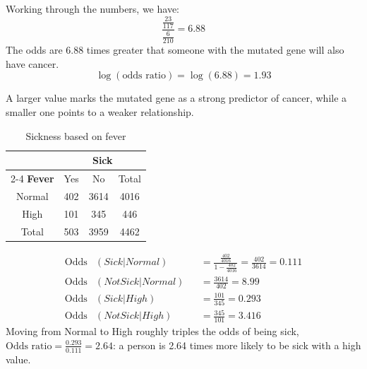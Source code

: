 \begin{example}
Working through the numbers, we have:
\[
\frac{\frac{23}{117}}{\frac{6}{210}}=6.88
\]
The odds are 6.88 times greater that someone with the mutated gene will also have cancer.
\begin{equation*}
\log(\text{odds ratio}) = \log(6.88) = 1.93    
\end{equation*}
 

A larger value marks the mutated gene as a strong predictor of cancer, while a smaller one points to a weaker relationship.
\end{example}
\newpage
\begin{table}[h]
\centering
\footnotesize
\begin{tabular}{|c|c|c|c|}
\hline
\multicolumn{1}{|c|}{} & \multicolumn{3}{c|}{\textbf{Sick}} \\
\cline{2-4}
\textbf{Fever} & Yes & No & Total \\
\hline
Normal & 402 & 3614 & 4016 \\
\hline
High & 101 & 345 & 446 \\
\hline
Total & 503 & 3959 & 4462 \\
\hline
\end{tabular}
\caption{Sickness based on fever}
\label{tab:sickness_fever}
\end{table}

\begin{example}
\begin{align*}
\text{Odds}&(Sick|Normal) &&= \frac{\frac{402}{4016}}{1 - \frac{402}{4016}} = \frac{402}{3614} = 0.111
\\
\text{Odds}&(Not Sick|Normal) &&= \frac{3614}{402} = 8.99
\\
\text{Odds}&(Sick|High) &&= \frac{101}{345} = 0.293
\\
\text{Odds}&(Not Sick|High) &&= \frac{345}{101} = 3.416
\end{align*}
Moving from Normal to High roughly triples the odds of being sick, $\text{Odds ratio} = \frac{0.293}{0.111} = 2.64$: a person is 2.64 times more likely to be sick with a high value.
\end{example}
